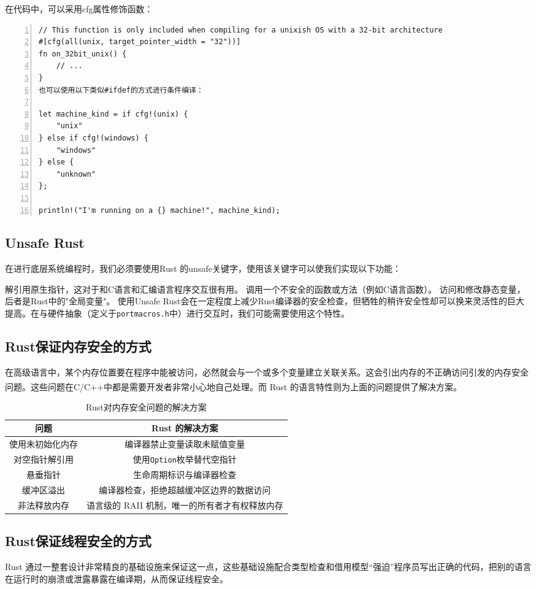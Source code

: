 \documentclass[UTF8,fontset=none,linespread=1.15]{ctexart}
\let\nosupcite\cite
\renewcommand*{\cite}[1]{\textsuperscript{\nosupcite{#1}}}
\begin{document}
在代码中，可以采用cfg属性修饰函数：
\begin{lstlisting}[numbers=left]
// This function is only included when compiling for a unixish OS with a 32-bit architecture
#[cfg(all(unix, target_pointer_width = "32"))]
fn on_32bit_unix() {
	// ...
}
也可以使用以下类似#ifdef的方式进行条件编译：

let machine_kind = if cfg!(unix) {
	"unix"
} else if cfg!(windows) {
	"windows"
} else {
	"unknown"
};

println!("I'm running on a {} machine!", machine_kind);	
\end{lstlisting}
\cite{e}
\subsection{Unsafe Rust}
在进行底层系统编程时，我们必须要使用Rust 的unsafe关键字，使用该关键字可以使我们实现以下功能：

解引用原生指针，这对于和C语言和汇编语言程序交互很有用。
调用一个不安全的函数或方法（例如C语言函数）。
访问和修改静态变量，后者是Rust中的"全局变量"。
使用Unsafe Rust会在一定程度上减少Rust编译器的安全检查，但牺牲的稍许安全性却可以换来灵活性的巨大提高。在与硬件抽象（定义于\texttt{portmacros.h}中）进行交互时，我们可能需要使用这个特性。
\subsection{Rust保证内存安全的方式}
在高级语言中，某个内存位置要在程序中能被访问，必然就会与一个或多个变量建立关联关系。这会引出内存的不正确访问引发的内存安全问题。这些问题在C/C++中都是需要开发者非常小心地自己处理。而 Rust 的语言特性则为上面的问题提供了解决方案。\cite{8}
\begin{table}[H]
\centering
\caption{Rust对内存安全问题的解决方案}
\begin{tabular}{|c|c|}
\hline
\textbf{问题} & \textbf{Rust 的解决方案}\\\hline
使用未初始化内存&编译器禁止变量读取未赋值变量\\\hline
对空指针解引用&使用\texttt{Option}枚举替代空指针\\\hline
悬垂指针&生命周期标识与编译器检查\\\hline
缓冲区溢出&编译器检查，拒绝超越缓冲区边界的数据访问\\\hline
非法释放内存&语言级的 RAII 机制，唯一的所有者才有权释放内存\\\hline
\end{tabular}
\end{table}
\subsection{Rust保证线程安全的方式}
Rust 通过一整套设计非常精良的基础设施来保证这一点，这些基础设施配合类型检查和借用模型“强迫”程序员写出正确的代码，把别的语言在运行时的崩溃或泄露暴露在编译期，从而保证线程安全。
\end{document}
